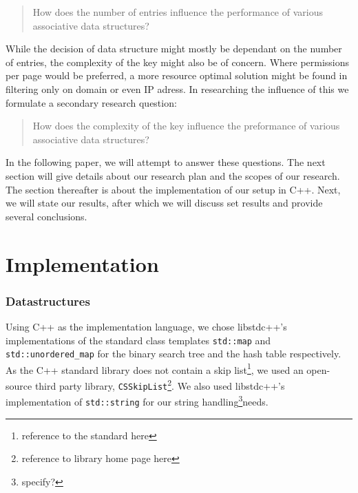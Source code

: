\documentclass[12pt,a4paper]{article}
\begin{document}
    \begin{quotation}How does the number of entries influence the performance of various associative data structures?\end{quotation}
    
    While the decision of data structure might mostly be dependant on the number of entries, the complexity
    of the key might also be of concern. Where permissions per page would be preferred, a more
    resource optimal solution might be found in filtering only on domain or even IP adress.
    In researching the influence of this we formulate a secondary research question:
    
    \begin{quotation}How does the complexity of the key influence the preformance of various associative data structures?\end{quotation}
    
    In the following paper, we will attempt to answer these questions. The next section will give details
    about our research plan and the scopes of our research. The section thereafter is about the implementation
    of our setup in C++. Next, we will state our results, after which we will discuss set results and provide
    several conclusions.    
    \section{Implementation}
    \subsubsection*{Datastructures}

    Using C++ as the implementation language, we chose libstdc++'s implementations of the standard class
    templates \texttt{std::map} and \texttt{std::unordered\_map} for the binary search
    tree and the hash table respectively.  As the C++ standard library does not contain a skip
    list\footnote{reference to the standard here}, we used an open-source third party library,
    \texttt{CSSkipList}\footnote{reference to library home page here}.  We also used libstdc++'s
    implementation of \texttt{std::string} for our string handling\footnote{specify?}needs.
    
\end{document}
